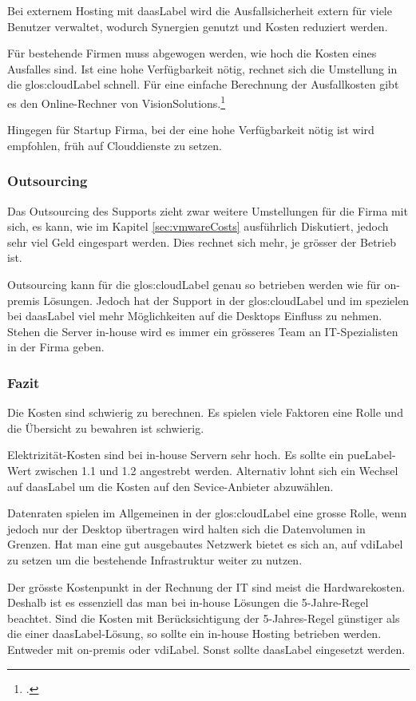 Bei externem Hosting mit \Gls{daasLabel} wird die Ausfallsicherheit extern für viele Benutzer verwaltet, wodurch Synergien genutzt und Kosten reduziert werden.

Für bestehende Firmen muss abgewogen werden, wie hoch die Kosten eines Ausfalles sind. Ist eine hohe Verfügbarkeit nötig, rechnet sich die Umstellung in die \Gls{glos:cloudLabel} schnell. Für eine einfache Berechnung der Ausfallkosten gibt es den Online-Rechner von VisionSolutions.\footcite{Disaster_Recovery_Resouce_Center_-_Vision_Solutions}

Hingegen für Startup Firma, bei der eine hohe Verfügbarkeit nötig ist wird empfohlen, früh auf Clouddienste zu setzen.

\subsubsection{Outsourcing}
Das Outsourcing des Supports zieht zwar weitere Umstellungen für die Firma mit sich, es kann, wie im Kapitel \cref{sec:vmwareCosts} ausführlich Diskutiert, jedoch sehr viel Geld eingespart werden. Dies rechnet sich mehr, je grösser der Betrieb ist.

Outsourcing kann für die \Gls{glos:cloudLabel} genau so betrieben werden wie für on-premis Lösungen. Jedoch hat der Support in der \Gls{glos:cloudLabel} und im spezielen bei \Gls{daasLabel} viel mehr Möglichkeiten auf die Desktops Einfluss zu nehmen. Stehen die Server in-house wird es immer ein grösseres Team an IT-Spezialisten in der Firma geben.

\subsubsection{Fazit}
Die Kosten sind schwierig zu berechnen. Es spielen viele Faktoren eine Rolle und die Übersicht zu bewahren ist schwierig.

Elektrizität-Kosten sind bei in-house Servern sehr hoch. Es sollte ein \Gls{pueLabel}-Wert zwischen 1.1 und 1.2 angestrebt werden. Alternativ lohnt sich ein Wechsel auf \Gls{daasLabel} um die Kosten auf den Sevice-Anbieter abzuwählen.

Datenraten spielen im Allgemeinen in der \Gls{glos:cloudLabel} eine grosse Rolle, wenn jedoch nur der Desktop übertragen wird halten sich die Datenvolumen in Grenzen. Hat man eine gut ausgebautes Netzwerk bietet es sich an, auf \Gls{vdiLabel} zu setzen um die bestehende Infrastruktur weiter zu nutzen.

Der grösste Kostenpunkt in der Rechnung der IT sind meist die Hardwarekosten. Deshalb ist es essenziell das man bei in-house Lösungen die 5-Jahre-Regel beachtet. Sind die Kosten mit Berücksichtigung der 5-Jahres-Regel günstiger als die einer \Gls{daasLabel}-Lösung, so sollte ein in-house Hosting betrieben werden. Entweder mit on-premis oder \Gls{vdiLabel}. Sonst sollte \Gls{daasLabel} eingesetzt werden.

